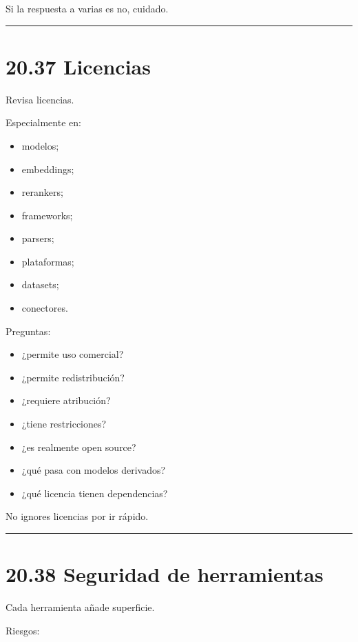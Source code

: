 Si la respuesta a varias es no, cuidado.

\begin{center}\rule{0.5\linewidth}{0.5pt}\end{center}

\section{20.37 Licencias}\label{licencias}

Revisa licencias.

Especialmente en:

\begin{itemize}
\tightlist
\item
  modelos;
\item
  embeddings;
\item
  rerankers;
\item
  frameworks;
\item
  parsers;
\item
  plataformas;
\item
  datasets;
\item
  conectores.
\end{itemize}

Preguntas:

\begin{itemize}
\tightlist
\item
  ¿permite uso comercial?
\item
  ¿permite redistribución?
\item
  ¿requiere atribución?
\item
  ¿tiene restricciones?
\item
  ¿es realmente open source?
\item
  ¿qué pasa con modelos derivados?
\item
  ¿qué licencia tienen dependencias?
\end{itemize}

No ignores licencias por ir rápido.

\begin{center}\rule{0.5\linewidth}{0.5pt}\end{center}

\section{20.38 Seguridad de
herramientas}\label{seguridad-de-herramientas}

Cada herramienta añade superficie.

Riesgos:

